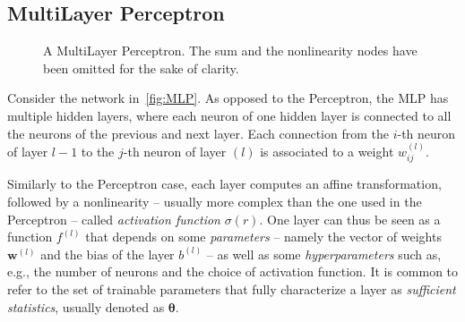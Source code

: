 \subsection{MultiLayer Perceptron}\label{sec:MLP}
\begin{figure}[h]
    \centering
    \begin{neuralnetwork} [nodespacing=7.5mm, layerspacing=23mm,
            maintitleheight=2.5em, layertitleheight=5em,
            height=3, toprow=true, nodesize=17pt,
            style={}, title={}, titlestyle={}]
        \hiddenlayer[count=3, bias=true, title=Layer 1, text=\nodetexthi]
        {\setdefaultlinklabel{\wijllink}\linklayers}
        \hiddenlayer[count=5, bias=true, title=Layer 2, text=\nodetexthi]
        {\setdefaultlinklabel{\wijllink}\linklayers}
        \hiddenlayer[count=4, bias=true, title=Layer 3, text=\nodetexthi]
        {\setdefaultlinklabel{\wijllink}\linklayers}
        \outputlayer[count=1, text=\nodetexty]
        {\setdefaultlinklabel{\wijllink}\linklayers}
    \end{neuralnetwork}
    \centering
    \caption{\label{fig:MLP}A MultiLayer Perceptron. The sum and the
        nonlinearity nodes have been omitted for the sake of clarity.
    }
\end{figure}

Consider the network in~\autoref{fig:MLP}. As opposed to the Perceptron, the
MLP has multiple hidden layers, where each neuron of one hidden layer is
connected to all the neurons of the previous and next layer. Each connection
from the $i$-th neuron of layer $l-1$ to the $j$-th neuron of layer $(l)$ is
associated to a weight $w_{ij}^{(l)}$.

Similarly to the Perceptron case, each layer computes an affine transformation,
followed by a nonlinearity -- usually more complex than the one used in
the Perceptron -- called \emph{activation function} $\sigma(r)$. One layer can
thus be seen as a function $f^{(l)}$ that depends on some \emph{parameters} --
namely the vector of weights $\mathbf{w}^{(l)}$ and the bias of the layer
$b^{(l)}$ -- as well as some \emph{hyperparameters} such as, e.g., the number
of neurons and the choice of activation function. It is common to refer to the
set of trainable parameters that fully characterize a layer as \emph{sufficient
statistics}, usually denoted as $\boldsymbol{\theta}$.

